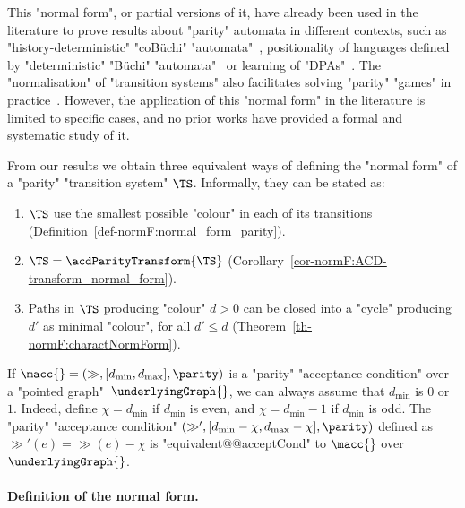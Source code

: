 \documentclass{theoretics}
\begin{document}
This "normal form", or partial versions of it, have already been used in the literature to prove results about "parity" automata in different contexts, such as "history-deterministic" "coB\"uchi" "automata"~\cite{AK22MinimizingGFG,EhlersSchewe22NaturalColors,KS15DeterminisationGFG}, positionality of languages defined by "deterministic" "B\"uchi" "automata"~\cite{BCRV22HalfPosBuchi} or learning of "DPAs"~\cite{BohnLoding23DetParityFromExamples}. The "normalisation" of "transition systems" also facilitates solving "parity" "games" in practice~\cite{FriedmannM09ParityGames}.
However, the application of this "normal form" in the literature is limited to specific cases, and no prior works have provided a formal and systematic study of it.

From our results we obtain three equivalent ways of defining the "normal form" of a "parity" "transition system" $\TS$. Informally, they can be stated as:
\begin{enumerate}
	\item $\TS$ use the smallest possible "colour" in each of its transitions (Definition~\ref{def-normF:normal_form_parity}).
	\item $\TS = \acdParityTransform{\TS}$ (Corollary~\ref{cor-normF:ACD-transform_normal_form}).
	\item Paths in $\TS$ producing "colour" $d>0$ can be closed into a "cycle" producing $d'$ as minimal "colour", for all $d'\leq d$ (Theorem~\ref{th-normF:charactNormForm}).
\end{enumerate}



\begin{remark}
	If $\macc{} = (\gg, [d_{\min}, d_{\max}], \parity)$ is a "parity" "acceptance condition" over a "pointed graph"~$\underlyingGraph{}$, we can always assume that $d_{\min}$ is $0$ or $1$. Indeed, define $\chi = d_{\min}$ if $d_{\min}$ is even, and $\chi = d_{\min} - 1$ if  $d_{\min}$ is odd. The "parity" "acceptance condition" $(\gg', [d_{\min} - \chi, d_{\max} - \chi], \parity)$ defined as $\gg'(e) = \gg(e) - \chi$ is "equivalent@@acceptCond" to $\macc{}$ over $\underlyingGraph{}$.
\end{remark}


\paragraph*{Definition of the normal form.}
\end{document}
